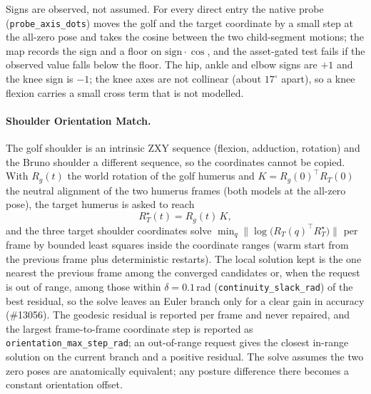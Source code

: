 Signs are observed, not assumed. For every direct entry the native probe
(\texttt{probe\_axis\_dots}) moves the golf and the target coordinate by a small
step at the all-zero pose and takes the cosine between the two child-segment
motions; the map records the sign and a floor on $\mathrm{sign}\cdot\cos$, and the
asset-gated test fails if the observed value falls below the floor. The hip,
ankle and elbow signs are $+1$ and the knee sign is $-1$; the knee axes are not
collinear (about $17^\circ$ apart), so a knee flexion carries a small cross term
that is not modelled.

\paragraph{Shoulder Orientation Match.}
The golf shoulder is an intrinsic ZXY sequence (flexion, adduction, rotation) and
the Bruno shoulder a different sequence, so the coordinates cannot be copied.
With $R_g(t)$ the world rotation of the golf humerus and
$K=R_g(0)^{\!\top}R_T(0)$ the neutral alignment of the two humerus frames (both
models at the all-zero pose), the target humerus is asked to reach
\begin{equation}
  R_T^{\star}(t)=R_g(t)\,K ,
\end{equation}
and the three target shoulder coordinates solve
$\min_{q}\bigl\|\log\bigl(R_T(q)^{\top}R_T^{\star}\bigr)\bigr\|$ per frame by
bounded least squares inside the coordinate ranges (warm start from the previous
frame plus deterministic restarts). The local solution kept is the one nearest the
previous frame among the converged candidates or, when the request is out of range,
among those within $\delta=0.1$\,rad (\texttt{continuity\_slack\_rad}) of the
best residual, so the solve leaves an Euler branch only for a clear gain in
accuracy (\#13056). The geodesic residual is reported per frame and never repaired,
and the largest frame-to-frame coordinate step is reported as
\texttt{orientation\_max\_step\_rad}; an out-of-range request gives the closest
in-range solution on the current branch and a positive residual. The solve assumes the two zero poses are anatomically
equivalent; any posture difference there becomes a constant orientation offset.

